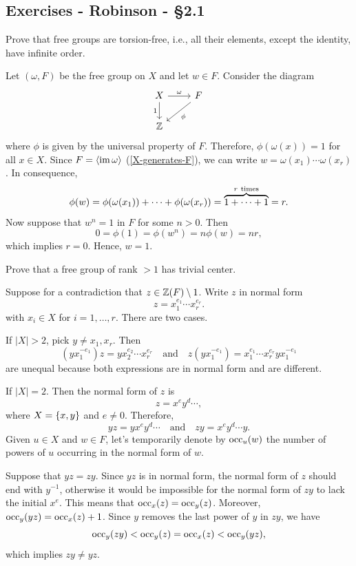 \subsection{Exercises - Robinson - \S 2.1}

\begin{exr}
    Prove that free groups are torsion-free, i.e., all their elements, except the identity, have infinite order.
\end{exr}

\begin{solution}
    Let $(\omega, F)$ be the free group on $X$ and let $w\in F$. Consider the diagram
    $$
        \begin{tikzcd}
            X
                    \arrow[d,"1"']
                    \arrow[r,"\omega"]
                &F
                    \arrow[ld,"\phi"]\\
                \Z
        \end{tikzcd}
    $$
    where $\phi$ is given by the universal property of $F$. Therefore, $\phi(\omega(x))=1$ for all $x\in X$. Since $F=\langle\operatorname{im}\omega\rangle$ (\ref{X-generates-F}), we can write $w=\omega(x_1)\cdots\omega(x_r)$. In consequence,
    $$
        \phi(w)=\phi(\omega(x_1))+\cdots+\phi(\omega(x_r))
            = \overbrace{1+\cdots+1}^{r\ \rm times}
            = r.
    $$
    Now suppose that $w^n=1$ in $F$ for some $n>0$. Then
    $$
        0=\phi(1)=\phi(w^n)=n\phi(w)=nr,
    $$
    which implies $r=0$. Hence, $w=1$.
\end{solution}

\begin{exr}
    Prove that a free group of rank\/ $>1$ has trivial center.
\end{exr}

\begin{solution}
    Suppose for a contradiction that $z\in\mathbb{Z}(F)\setminus1$. Write $z$ in normal form
    $$
        z = x_1^{e_1}\cdots x_r^{e_r}.
    $$
    with $x_i\in X$ for $i=1,\dots,r$. There are two cases.

    If $|X|>2$, pick $y\ne x_1,x_r$. Then
    $$
        (yx_1^{-e_1})z = yx_2^{e_2}\cdots x_r^{e_r}
        \quad\text{and}\quad
        z(yx_1^{-e_1}) = x_1^{e_1}\cdots x_r^{e_r}yx_1^{-e_1}
    $$
    are unequal because both expressions are in normal form and are different.

    If $|X|=2$. Then the normal form of $z$ is
    $$
        z = x^ey^d\cdots,
    $$
    where $X=\{x,y\}$ and $e\ne0$. Therefore,
    $$
        yz = yx^ey^d\cdots
        \quad\text{and}\quad
        zy = x^ey^d\cdots y.
    $$
    Given $u\in X$ and $w\in F$, let's temporarily denote by $\operatorname{occ}_u(w)$ the number of powers of $u$ occurring in the normal form of $w$.
    
    Suppose that $yz=zy$. Since $yz$ is in normal form, the normal form of $z$ should end with $y^{-1}$, otherwise it would be impossible for the normal form of $zy$ to lack the initial $x^e$. This means that $\operatorname{occ}_x(z)=\operatorname{occ}_y(z)$. Moreover, $\operatorname{occ}_y(yz)=\operatorname{occ}_x(z)+1$. Since $y$ removes the last power of $y$ in $zy$, we have
    $$
        \operatorname{occ}_y(zy)<\operatorname{occ}_y(z)=\operatorname{occ}_x(z)<\operatorname{occ}_y(yz),
    $$
    which implies $zy\ne yz$.
\end{solution}

